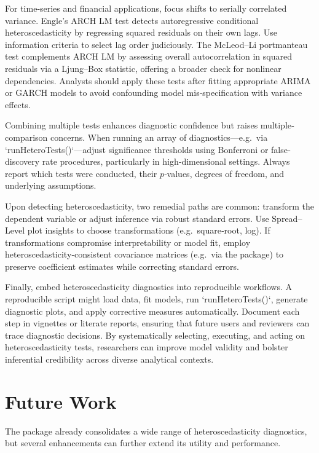 For time‐series and financial applications, focus shifts to serially correlated variance. Engle’s ARCH LM test detects autoregressive conditional heteroscedasticity by regressing squared residuals on their own lags. Use information criteria to select lag order judiciously. The McLeod–Li portmanteau test complements ARCH LM by assessing overall autocorrelation in squared residuals via a Ljung–Box statistic, offering a broader check for nonlinear dependencies. Analysts should apply these tests after fitting appropriate ARIMA or GARCH models to avoid confounding model mis‐specification with variance effects.

Combining multiple tests enhances diagnostic confidence but raises multiple‐comparison concerns. When running an array of diagnostics—e.g.\ via `runHeteroTests()`—adjust significance thresholds using Bonferroni or false‐discovery rate procedures, particularly in high‐dimensional settings. Always report which tests were conducted, their $p$‐values, degrees of freedom, and underlying assumptions.

Upon detecting heteroscedasticity, two remedial paths are common: transform the dependent variable or adjust inference via robust standard errors. Use Spread–Level plot insights to choose transformations (e.g.\ square‐root, log). If transformations compromise interpretability or model fit, employ heteroscedasticity‐consistent covariance matrices (e.g.\ via the  package) to preserve coefficient estimates while correcting standard errors.

Finally, embed heteroscedasticity diagnostics into reproducible workflows. A reproducible script might load data, fit models, run `runHeteroTests()`, generate diagnostic plots, and apply corrective measures automatically. Document each step in vignettes or literate reports, ensuring that future users and reviewers can trace diagnostic decisions. By systematically selecting, executing, and acting on heteroscedasticity tests, researchers can improve model validity and bolster inferential credibility across diverse analytical contexts.


\section{Future Work}\label{sec:future}
The  package already consolidates a wide range of heteroscedasticity diagnostics, but several enhancements can further extend its utility and performance.

